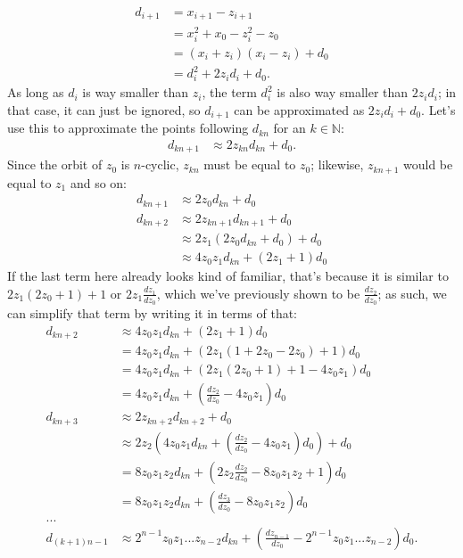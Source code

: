 \documentclass[12pt,a4paper]{article}
\begin{document}
\begin{align*}
	d_{i+1}&=x_{i+1}-z_{i+1}\\
	&=x_i^2+x_0-z_i^2-z_0\\
	&=(x_i+z_i)(x_i-z_i)+d_0\\
	&=d_i^2+2z_id_i+d_0.
\end{align*}
As long as $d_i$ is way smaller than $z_i$, the term $d_i^2$ is also way smaller than $2z_id_i$; in that case, it can just be ignored, so $d_{i+1}$ can be approximated as $2z_id_i+d_0$. Let's use this to approximate the points following $d_{kn}$ for an $k\in\mathbb{N}$:
\begin{align*}
	d_{kn+1}&\approx 2z_{kn}d_{kn}+d_0.
\end{align*}
Since the orbit of $z_0$ is $n$-cyclic, $z_{kn}$ must be equal to $z_0$; likewise, $z_{kn+1}$ would be equal to $z_1$ and so on:
\begin{align*}
	d_{kn+1}&\approx 2z_0d_{kn}+d_0\\
	d_{kn+2}&\approx 2z_{kn+1}d_{kn+1}+d_0\\
	&\approx 2z_1(2z_0d_{kn}+d_0)+d_0\\
	&\approx 4z_0z_1d_{kn}+(2z_1+1)d_0
\end{align*}
If the last term here already looks kind of familiar, that's because it is similar to $2z_1(2z_0+1)+1$ or $2z_1\frac{dz_1}{dz_0}$, which we've previously shown to be $\frac{dz_2}{dz_0}$; as such, we can simplify that term by writing it in terms of that:
\begin{align*}
d_{kn+2}&\approx 4z_0z_1d_{kn}+(2z_1+1)d_0\\
&=4z_0z_1d_{kn}+(2z_1(1+2z_0-2z_0)+1)d_0\\
&=4z_0z_1d_{kn}+(2z_1(2z_0+1)+1-4z_0z_1)d_0\\
&=4z_0z_1d_{kn}+(\frac{dz_2}{dz_0}-4z_0z_1)d_0\\
d_{kn+3}&\approx 2z_{kn+2}d_{kn+2}+d_0\\
&\approx 2z_2(4z_0z_1d_{kn}+(\frac{dz_2}{dz_0}-4z_0z_1)d_0)+d_0\\
&=8z_0z_1z_2d_{kn}+(2z_2\frac{dz_2}{dz_0}-8z_0z_1z_2+1)d_0\\
&=8z_0z_1z_2d_{kn}+(\frac{dz_3}{dz_0}-8z_0z_1z_2)d_0\\
...\\
d_{(k+1)n-1}&\approx 2^{n-1}z_0z_1...z_{n-2}d_{kn}+(\frac{dz_{n-1}}{dz_0}-2^{n-1}z_0z_1...z_{n-2})d_0.
\end{align*}
\end{document}
